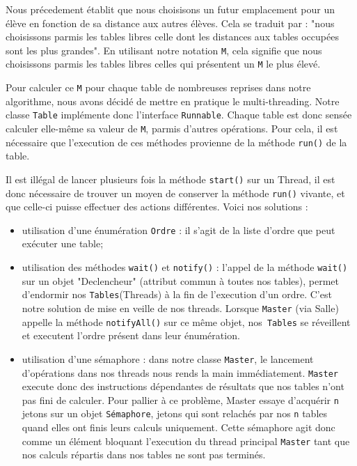 \documentclass[11pt,a4paper, openany]{book}
\begin{document}
Nous précedement établit que nous choisisons un futur emplacement pour un élève en fonction de sa distance aux autres élèves.
Cela se traduit par : "nous choisissons parmis les tables libres celle dont les distances aux tables occupées sont les plus grandes". En utilisant notre notation \texttt{M}, cela signifie que nous choisissons parmis les tables libres celles qui présentent un \texttt{M} le plus élevé.

Pour calculer ce \texttt{M} pour chaque table de nombreuses reprises dans notre algorithme, nous avons décidé de mettre en pratique le multi-threading.
Notre classe \texttt{Table} implémente donc l'interface \texttt{Runnable}. Chaque table est donc sensée calculer elle-même sa valeur de \texttt{M}, parmis d'autres opérations. Pour cela, il est nécessaire que l'execution de ces méthodes provienne de la méthode \texttt{run()} de la table. 

Il est illégal de lancer plusieurs fois la méthode \texttt{start()} sur un Thread, il est donc nécessaire de trouver un moyen de conserver la méthode \texttt{run()} vivante, et que celle-ci puisse effectuer des actions différentes. Voici nos solutions : 
\begin{itemize}
\item utilisation d'une énumération \texttt{Ordre} : il s'agit de la liste d'ordre que peut exécuter une table;
\item utilisation des méthodes \texttt{wait()} et \texttt{notify()} : l'appel de la méthode \texttt{wait()} sur un objet "Declencheur" (attribut commun à toutes nos tables), permet d'endormir nos \texttt{Tables}(Threads) à la fin de l'execution d'un ordre. C'est notre solution de mise en veille de nos threads. Lorsque \texttt{Master} (via Salle) appelle la méthode \texttt{notifyAll()} sur ce même objet, nos\texttt{ Tables} se réveillent et executent l'ordre présent dans leur énumération.
\item utilisation d'une sémaphore : dans notre classe \texttt{Master}, le lancement d'opérations dans nos threads nous rends la main immédiatement. \texttt{Master} execute donc des instructions dépendantes de résultats que nos tables n'ont pas fini de calculer. Pour pallier à ce problème, Master essaye d'acquérir \texttt{n} jetons sur un objet \texttt{Sémaphore}, jetons qui sont relachés par nos \texttt{n} tables quand elles ont finis leurs calculs uniquement.
Cette sémaphore agit donc comme un élément bloquant l'execution du thread principal \texttt{Master} tant que nos calculs répartis dans nos tables ne sont pas terminés.
\end{itemize}
\end{document}
